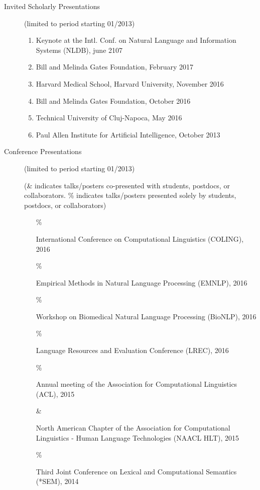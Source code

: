 \documentclass[10pt]{article}
\newcommand{\lmt}{(limited to period starting 01/2013)}
\begin{document}
\begin{description}
\item [Invited Scholarly Presentations] \lmt \
\begin{enumerate}

\item Keynote at the Intl. Conf. on Natural Language and Information Systems (NLDB), june 2107
\item Bill and Melinda Gates Foundation, February 2017
\item Harvard Medical School, Harvard University, November 2016
\item Bill and Melinda Gates Foundation, October 2016
\item Technical University of Cluj-Napoca, May 2016
\item Paul Allen Institute for Artificial Intelligence, October 2013
\end{enumerate}

\item [Conference Presentations] \lmt \

(\& indicates talks/posters co-presented with students, postdocs, or collaborators. \% indicates talks/posters presented solely by students, postdocs, or collaborators)


\begin{enumerate}

\item 
[\% \addtocounter{enumi}{1}\theenumi ]
International Conference on Computational Linguistics (COLING), 2016

\item 
[\% \addtocounter{enumi}{1}\theenumi ]
Empirical Methods in Natural Language Processing (EMNLP), 2016

\item 
[\% \addtocounter{enumi}{1}\theenumi ]
Workshop on Biomedical Natural Language Processing (BioNLP), 2016

\item 
[\% \addtocounter{enumi}{1}\theenumi ]
Language Resources and Evaluation Conference (LREC), 2016

\item 
[\% \addtocounter{enumi}{1}\theenumi ]
Annual meeting of the Association for Computational Linguistics (ACL), 2015

\item 
[\& \addtocounter{enumi}{1}\theenumi ]
North American Chapter of the Association for Computational Linguistics - Human Language Technologies (NAACL HLT), 2015

\item 
[\% \addtocounter{enumi}{1}\theenumi ]
Third Joint Conference on Lexical and Computational Semantics (*SEM), 2014


\end{enumerate}
\end{description}
\end{document}
